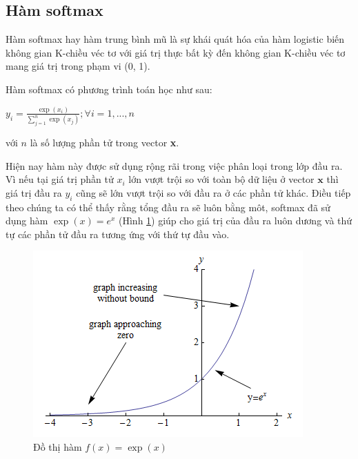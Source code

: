 	\subsection{Hàm softmax}
	\label{sec:softmax}
	Hàm softmax hay hàm trung bình mũ là sự khái quát hóa của hàm logistic biến không gian K-chiều véc tơ  với giá trị thực bất kỳ đến không gian K-chiều véc tơ  mang giá trị trong phạm vi (0, 1).\par

Hàm softmax có phương trình toán học như sau:
\begin{center}
	$y_i=\frac{\exp({x_i})}{\sum^{n}_{j=1}{\exp({x_j})}}; \forall i=1,...,n$ %
	
	
\end{center}	
với $n$ là số lượng phần tử trong vector \textbf{x}.\par
Hiện nay hàm này được sử dụng rộng rãi trong việc phân loại trong lớp đầu ra. Vì nếu tại giá trị phần tử $x_i$ lớn vượt trội so với toàn bộ dữ liệu ở vector $\textbf{x}$ thì giá trị đầu ra $y_i$ cũng sẽ lớn vượt trội so với đầu ra ở các phần tử khác. Điều tiếp theo chúng ta có thể thấy rằng tổng đầu ra sẽ luôn bằng môt, softmax đã sử dụng hàm $\exp(x)=e^{x}$ (Hình \ref{fig:hamex}) giúp cho giá trị của đầu ra luôn dương và thứ tự các phần tử đầu ra tương ứng với thứ tự đầu vào.
\begin{center}
	\begin{figure}[htp]
	\begin{center}
		\includegraphics[scale=1]{chap3/image/expgraph.png}
	\end{center}			
	\caption{Đồ thị hàm $f(x)=\exp(x)$}
	\label{fig:hamex}
	\end{figure}
\end{center}

